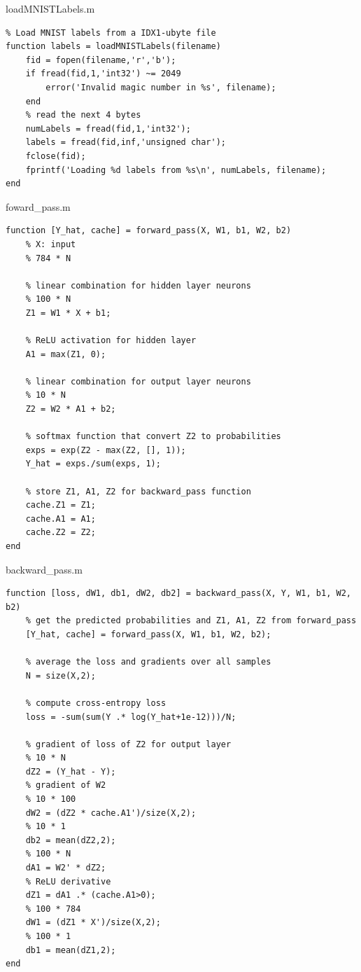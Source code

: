 \documentclass[fleqn]{rbfin}
\begin{document}
loadMNISTLabels.m

\begin{lstlisting}
% Load MNIST labels from a IDX1-ubyte file
function labels = loadMNISTLabels(filename)
    fid = fopen(filename,'r','b');
    if fread(fid,1,'int32') ~= 2049
        error('Invalid magic number in %s', filename);
    end
    % read the next 4 bytes
    numLabels = fread(fid,1,'int32');
    labels = fread(fid,inf,'unsigned char');
    fclose(fid);
    fprintf('Loading %d labels from %s\n', numLabels, filename);
end
\end{lstlisting}

foward\_pass.m

\begin{lstlisting}
function [Y_hat, cache] = forward_pass(X, W1, b1, W2, b2)
    % X: input
    % 784 * N

    % linear combination for hidden layer neurons
    % 100 * N
    Z1 = W1 * X + b1; 

    % ReLU activation for hidden layer
    A1 = max(Z1, 0);

    % linear combination for output layer neurons
    % 10 * N
    Z2 = W2 * A1 + b2; 

    % softmax function that convert Z2 to probabilities
    exps = exp(Z2 - max(Z2, [], 1));
    Y_hat = exps./sum(exps, 1);

    % store Z1, A1, Z2 for backward_pass function
    cache.Z1 = Z1;
    cache.A1 = A1;
    cache.Z2 = Z2;
end
\end{lstlisting}

backward\_pass.m
\begin{lstlisting}
function [loss, dW1, db1, dW2, db2] = backward_pass(X, Y, W1, b1, W2, b2)
    % get the predicted probabilities and Z1, A1, Z2 from forward_pass
    [Y_hat, cache] = forward_pass(X, W1, b1, W2, b2);
    
    % average the loss and gradients over all samples
    N = size(X,2);

    % compute cross-entropy loss
    loss = -sum(sum(Y .* log(Y_hat+1e-12)))/N;
    
    % gradient of loss of Z2 for output layer
    % 10 * N
    dZ2 = (Y_hat - Y);
    % gradient of W2
    % 10 * 100
    dW2 = (dZ2 * cache.A1')/size(X,2);
    % 10 * 1
    db2 = mean(dZ2,2);
    % 100 * N
    dA1 = W2' * dZ2;
    % ReLU derivative
    dZ1 = dA1 .* (cache.A1>0); 
    % 100 * 784
    dW1 = (dZ1 * X')/size(X,2);
    % 100 * 1
    db1 = mean(dZ1,2);
end

\end{lstlisting}
\end{document}
